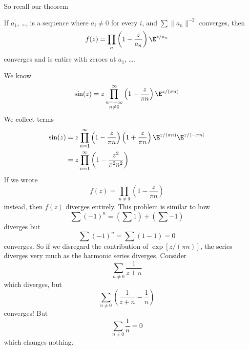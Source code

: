 So recall our theorem
\begin{thm}
If $a_{1}$, \dots, is a sequence where $a_{i}\not=0$ for every
$i$, and $\sum\|a_{n}\|^{-2}$ converges, then 
\begin{equation}
f(z) = \prod_{n}\left(1-\frac{z}{a_{n}}\right)\E^{z/a_{n}}
\end{equation}
converges and is entire with zeroes at $a_{1}$, \dots.
\end{thm}
We know
\begin{equation}
\sin(z)=z\prod^{\infty}_{\substack{n=-\infty\\n\not=0}}\left(1-\frac{z}{\pi n}\right)
\E^{z/(\pi n)}
\end{equation}
We collect terms
\begin{subequations}
\begin{align}
\sin(z)&=z\prod^{\infty}_{n=1}\left(1-\frac{z}{\pi n}\right)\left(1+\frac{z}{\pi n}\right)
\E^{z/(\pi n)}\E^{z/(-\pi n)}\\
&=z\prod^{\infty}_{n=1}\left(1-\frac{z^{2}}{\pi^{2}n^{2}}\right)
\end{align}
\end{subequations}
If we wrote
\begin{equation}
f(z) = \prod_{n\not=0}\left(1-\frac{z}{\pi n}\right)
\end{equation}
instead, then $f(z)$ diverges entirely. This problem is similar
to how
\begin{equation}
\sum(-1)^{n}=\left(\sum 1\right)+\left(\sum -1\right)
\end{equation}
diverges but
\begin{equation}
\sum(-1)^{n}=\sum (1-1)=0
\end{equation}
converges. So if we disregard the contribution of $\exp[z/(\pi
  n)]$, the series diverges very much as the harmonic series diverges.
Consider
\begin{equation}
\sum_{n\not=0}\frac{1}{z+n}
\end{equation}
which diverges, but
\begin{equation}
\sum_{n\not=0}\left(\frac{1}{z+n}-\frac{1}{n}\right)
\end{equation}
converges! But
\begin{equation}
\sum_{n\not=0}\frac{1}{n}=0
\end{equation}
which changes nothing.

